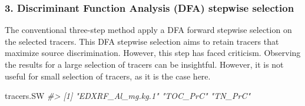\documentclass[
]{article}
\newenvironment{Shaded}{\begin{snugshade}}{\end{snugshade}}
\newcommand{\AttributeTok}[1]{\textcolor[rgb]{0.13,0.29,0.53}{#1}}
\newcommand{\CommentTok}[1]{\textcolor[rgb]{0.56,0.35,0.01}{\textit{#1}}}
\newcommand{\FunctionTok}[1]{\textcolor[rgb]{0.13,0.29,0.53}{\textbf{#1}}}
\newcommand{\NormalTok}[1]{#1}
\newcommand{\OtherTok}[1]{\textcolor[rgb]{0.56,0.35,0.01}{#1}}
\newcommand{\SpecialCharTok}[1]{\textcolor[rgb]{0.81,0.36,0.00}{\textbf{#1}}}
\newcommand{\StringTok}[1]{\textcolor[rgb]{0.31,0.60,0.02}{#1}}
\begin{document}
\hypertarget{discriminant-function-analysis-dfa-stepwise-selection}{%
\subsubsection{3. Discriminant Function Analysis (DFA) stepwise
selection}\label{discriminant-function-analysis-dfa-stepwise-selection}}

The conventional three-step method apply a DFA forward stepwise
selection on the selected tracers. This DFA stepwise selection aims to
retain tracers that maximize source discrimination. However, this step
has faced criticism. Observing the results for a large selection of
tracers can be insightful. However, it is not useful for small selection
of tracers, as it is the case here.

\begin{Shaded}
\end{Shaded}

\begin{Shaded}
\begin{Highlighting}[]
\NormalTok{tracers.SW}
\CommentTok{\#\textgreater{} [1] "EDXRF\_Al\_mg.kg.1" "TOC\_PrC"          "TN\_PrC"}
\end{Highlighting}
\end{Shaded}
\end{document}
